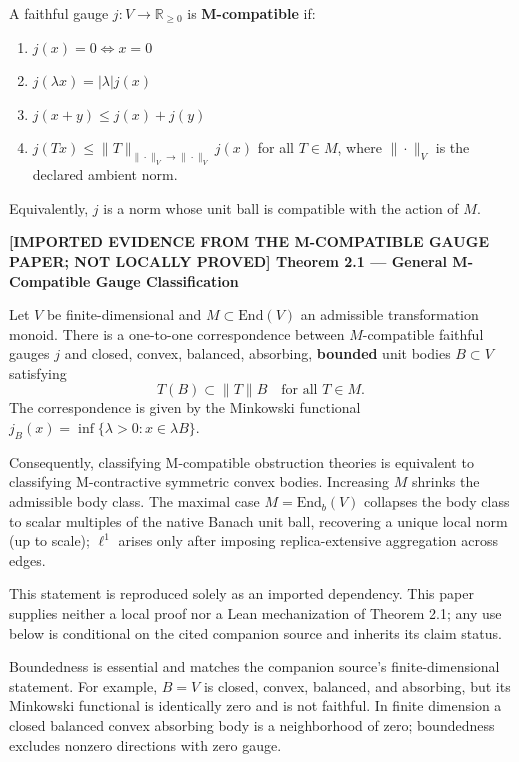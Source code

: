 \documentclass[
  11pt,
]{article}
\providecommand{\tightlist}{%
  \setlength{\itemsep}{0pt}\setlength{\parskip}{0pt}}
\providecommand{\tightlist}{%
  \setlength{\itemsep}{0pt}\setlength{\parskip}{0pt}}
\renewenvironment{quote}
  {\begin{leftbar}\small}
  {\end{leftbar}}
\begin{document}
A faithful gauge \(j: V \to \mathbb{R}_{\geq 0}\) is
\textbf{M-compatible} if:

\begin{enumerate}
\def\labelenumi{\arabic{enumi}.}
\tightlist
\item
  \(j(x) = 0 \iff x = 0\)
\item
  \(j(\lambda x) = |\lambda| j(x)\)
\item
  \(j(x + y) \leq j(x) + j(y)\)
\item
  \(j(Tx) \leq \|T\|_{\|\cdot\|_V\to\|\cdot\|_V} j(x)\) for all
  \(T \in M\), where \(\|\cdot\|_V\) is the declared ambient norm.
\end{enumerate}

Equivalently, \(j\) is a norm whose unit ball is compatible with the
action of \(M\).

\begin{quote}
\textbf{{[}IMPORTED EVIDENCE FROM THE M-COMPATIBLE GAUGE PAPER; NOT
LOCALLY PROVED{]} Theorem 2.1 --- General M-Compatible Gauge
Classification}

Let \(V\) be finite-dimensional and \(M \subset \text{End}(V)\) an
admissible transformation monoid. There is a one-to-one correspondence
between \(M\)-compatible faithful gauges \(j\) and closed, convex,
balanced, absorbing, \textbf{bounded} unit bodies \(B \subset V\)
satisfying \[T(B) \subset \|T\| B \quad \text{for all } T \in M.\] The
correspondence is given by the Minkowski functional
\(j_B(x) = \inf\{\lambda > 0 : x \in \lambda B\}\).

Consequently, classifying M-compatible obstruction theories is
equivalent to classifying M-contractive symmetric convex bodies.
Increasing \(M\) shrinks the admissible body class. The maximal case
\(M = \text{End}_b(V)\) collapses the body class to scalar multiples of
the native Banach unit ball, recovering a unique local norm (up to
scale); \(\ell^1\) arises only after imposing replica-extensive
aggregation across edges.

This statement is reproduced solely as an imported dependency. This
paper supplies neither a local proof nor a Lean mechanization of Theorem
2.1; any use below is conditional on the cited companion source and
inherits its claim status.

Boundedness is essential and matches the companion source's
finite-dimensional statement. For example, \(B=V\) is closed, convex,
balanced, and absorbing, but its Minkowski functional is identically
zero and is not faithful. In finite dimension a closed balanced convex
absorbing body is a neighborhood of zero; boundedness excludes nonzero
directions with zero gauge.
\end{quote}
\end{document}
